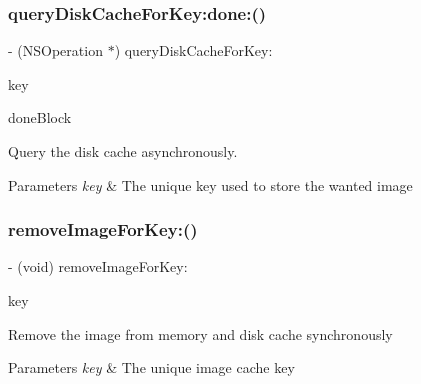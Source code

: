 \subsubsection{\texorpdfstring{query\+Disk\+Cache\+For\+Key\+:done\+:()}{queryDiskCacheForKey:done:()}\hspace{0.1cm}{\footnotesize\ttfamily [3/3]}}
{\footnotesize\ttfamily -\/ (N\+S\+Operation $\ast$) query\+Disk\+Cache\+For\+Key\+: \begin{DoxyParamCaption}\item[{(N\+S\+String $\ast$)}]{key }\item[{done:(S\+D\+Web\+Image\+Query\+Completed\+Block)}]{done\+Block }\end{DoxyParamCaption}}

Query the disk cache asynchronously.


\begin{DoxyParams}{Parameters}
{\em key} & The unique key used to store the wanted image \\
\hline
\end{DoxyParams}
\mbox{\label{interface_s_d_image_cache_a1d6ca2afef59216e0cb1740d431833cf}} 
\subsubsection{\texorpdfstring{remove\+Image\+For\+Key\+:()}{removeImageForKey:()}\hspace{0.1cm}{\footnotesize\ttfamily [1/3]}}
{\footnotesize\ttfamily -\/ (void) remove\+Image\+For\+Key\+: \begin{DoxyParamCaption}\item[{(N\+S\+String $\ast$)}]{key }\end{DoxyParamCaption}}

Remove the image from memory and disk cache synchronously


\begin{DoxyParams}{Parameters}
{\em key} & The unique image cache key \\
\hline
\end{DoxyParams}
\mbox{\label{interface_s_d_image_cache_a1d6ca2afef59216e0cb1740d431833cf}} 
